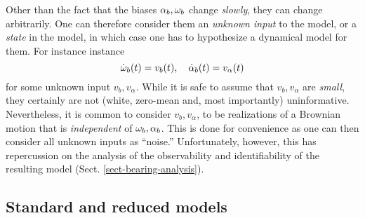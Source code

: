 Other than the fact that the biases $\alpha_b, \omega_b$ change {\em slowly}, they can change arbitrarily. One can therefore consider them an {\em unknown input} to the model, or a {\em state} in the model, in which case one has to hypothesize a dynamical model for them. For instance instance
\begin{equation}
\dot {\omega}_b(t) = v_b(t), ~~~ \dot \alpha_b(t) = v_\alpha(t)
\end{equation}
for some unknown input $v_b, v_\alpha$. While it is safe to assume that $v_b, v_\alpha$ are {\em small}, they certainly are not (white, zero-mean and, most importantly) uninformative. Nevertheless, it is common to consider $v_b, v_\alpha$, to be realizations of a Brownian motion that is  {\em independent} of $\omega_b, \alpha_b$. This is done for convenience as one can then consider all unknown inputs as ``noise.'' Unfortunately, however, this has repercussion on the analysis of the observability and identifiability of the resulting model (Sect. \ref{sect-bearing-analysis}).


\subsection{Standard and reduced models}

